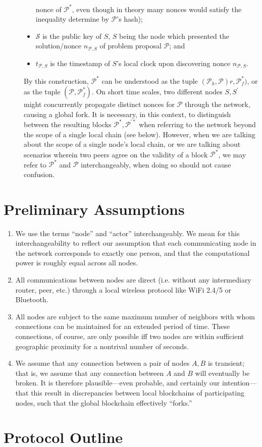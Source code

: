 \documentclass{article}
\begin{document}
\begin{description}
\begin{itemize}
				nonce of $\mathcal{P}^*$, even though in theory many nonces
				would satisfy the inequality determine by $\mathcal{P}$'s
				hash);
			\item $\mathcal{S}$ is the public key of $S$, $S$ being the node
				which presented the solution/nonce $n_{\mathcal{P},S}$ of
				problem proposal $\mathcal{P}$; and
			\item $t_{\mathcal{P},S}$ is the timestamp of $S$'s local clock
				upon discovering nonce $n_{\mathcal{P},S}$.
		\end{itemize}
		By this construction, $\mathcal{P}^*$ can be understood as the tuple
		$(\mathcal{P}_h,\mathcal{P})r,\mathcal{P}^*_f)$, or as the tuple
		$(\mathcal{P},\mathcal{P}^*_f)$. On short time scales, two different
		nodes $S,S^\prime$ might concurrently propagate distinct nonces
		for $\mathcal{P}$ through the network, causing a global fork. It is
		necessary, in this context, to distinguish between the resulting blocks
		$\mathcal{P}^*,\mathcal{P}^{\prime *}$ when referring to the network
		beyond the scope of a single local chain (see below). However, when we
		are talking about the scope of a single node's local chain, or we are
		talking about scenarios wherein two peers agree on the validity of a
		block $\mathcal{P}^*$, we may refer to $\mathcal{P}^*$ and $\mathcal{P}$
		interchangeably, when doing so should not cause confusion.
\end{description}

\section*{Preliminary Assumptions}
\begin{enumerate}
	\item We use the terms ``node'' and ``actor'' interchangeably. We mean for this
		interchangeability to reflect our assumption that each communicating
		node in the network corresponds to exactly one person, and that the
		computational power is roughly equal across all nodes.
	\item All communications between nodes are direct (i.e. without any intermediary
		router, peer, etc.) through a local wireless protocol like WiFi 2.4/5 or
		Bluetooth.
	\item All nodes are subject to the same maximum number of neighbors with whom
		connections can be maintained for an extended period of time. These
		connections, of course, are only possible iff two nodes are within
		sufficient geographic proximity for a nontrival number of seconds.
	\item We assume that any connection between a pair of nodes $A,B$ is transient;
		that is, we assume that any connection between $A$ and $B$ will eventually
		be broken. It is therefore plausible---even probable, and certainly our
		intention---that this result in discrepancies between local blockchains
		of participating nodes, such that the global blockchain effectively
		``forks.''
\end{enumerate}

\section*{Protocol Outline}
\end{document}

